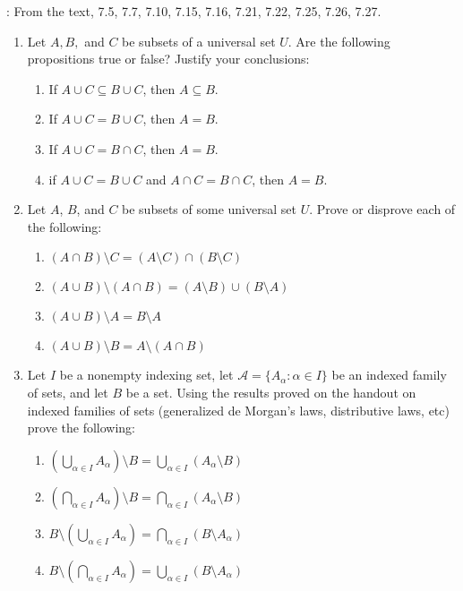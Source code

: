 \documentclass[letterpaper,12pt]{article}
\begin{document}
: From the text, 7.5, 7.7, 7.10, 7.15, 7.16, 7.21, 7.22, 7.25, 7.26, 7.27.
\begin{enumerate}
\item Let $A, B,$ and $C$ be subsets of a universal set $U$. Are the following propositions true or false? Justify your conclusions:
\begin{enumerate}
\item If $A\cup C\subseteq B\cup C$, then $A\subseteq B$.
\item If $A\cup C = B\cup C$, then $A=B$.
\item If $A\cup C = B\cap C$, then $A=B$.
\item if $A\cup C = B\cup C$ and $A\cap C = B\cap C$, then $A=B$.
\end{enumerate}
\item Let $A$, $B$, and $C$ be subsets of some universal set $U$. Prove or disprove each of the following:
\begin{enumerate}
\item $(A\cap B)\setminus C = (A\setminus C)\cap (B\setminus C)$
\item $(A\cup B)\setminus (A\cap B) = (A\setminus B)\cup (B\setminus A)$
\item $(A\cup B)\setminus A = B\setminus A$
\item $(A\cup B)\setminus B = A\setminus (A\cap B)$
\end{enumerate}
\item Let $I$ be a nonempty indexing set, let $\mathcal{A} = \{A_\alpha : \alpha\in I\}$ be an indexed family of sets, and let $B$ be a set. Using the results proved on the handout on indexed families of sets (generalized de Morgan's laws, distributive laws, etc) prove the following:
\begin{enumerate}
\item $\left(\bigcup_{\alpha\in I}A_\alpha\right)\setminus B = \bigcup_{\alpha\in I}(A_\alpha\setminus B)$
\item $\left(\bigcap_{\alpha\in I}A_\alpha\right)\setminus B = \bigcap_{\alpha\in I}(A_\alpha\setminus B)$
\item $B\setminus\left(\bigcup_{\alpha\in I}A_\alpha\right) = \bigcap_{\alpha\in I}(B\setminus A_\alpha)$
\item $B\setminus\left(\bigcap_{\alpha\in I}A_\alpha\right) = \bigcup_{\alpha\in I}(B\setminus A_\alpha)$
\end{enumerate}
\end{enumerate}
\end{document}
